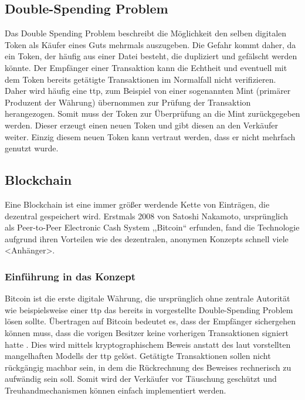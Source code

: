 \subsection{Double-Spending Problem}
\label{sec:sota_doublespend}
	Das Double Spending Problem beschreibt die Möglichkeit den selben digitalen Token als Käufer eines Guts mehrmals auszugeben\cite{Chohan2017}.
	Die Gefahr kommt daher, da ein Token, der häufig aus einer Datei besteht, die dupliziert und gefälscht werden könnte\cite{Chohan2017}.
	Der Empfänger einer Transaktion kann die Echtheit und eventuell mit dem Token bereits getätigte Transaktionen im Normalfall nicht verifizieren\cite{Nakamoto2008}.
	Daher wird häufig eine \gls{ttp}, zum Beispiel von einer sogenannten Mint (primärer Produzent der Währung) übernommen zur Prüfung der Transaktion herangezogen\cite{Nakamoto2008}.
	Somit muss der Token zur Überprüfung an die Mint zurückgegeben werden. 
	Dieser erzeugt einen neuen Token und gibt diesen an den Verkäufer weiter.
	Einzig diesem neuen Token kann vertraut werden, dass er nicht mehrfach genutzt wurde\cite{Nakamoto2008}.
	
\subsection{Blockchain}
\label{sec:sota_blockchain}
    Eine Blockchain ist eine immer größer werdende Kette von Einträgen, die dezentral gespeichert wird. 
    Erstmals 2008 von Satoshi Nakamoto, ursprünglich als Peer-to-Peer Electronic Cash System ,,Bitcoin`` erfunden, fand die Technologie aufgrund ihren Vorteilen wie des dezentralen, anonymen Konzepts schnell viele <Anhänger>. 
    
    \subsubsection{Einführung in das Konzept}
    \label{sec:sota_blockchain_introduction}
    Bitcoin ist die erste digitale Währung, die ursprünglich ohne zentrale Autorität wie beispielsweise einer \gls{ttp} das bereits in  vorgestellte Double-Spending Problem lösen sollte\cite{Nakamoto2008}. 
    Übertragen auf Bitcoin bedeutet es, dass der Empfänger sichergehen können muss, dass die vorigen Besitzer keine vorherigen Transaktionen signiert hatte \cite{Nakamoto2008}.
    Dies wird mittels kryptographischem Beweis anstatt des laut \citeauthor{Nakamoto2008} vorstellten mangelhaften Modells der \gls{ttp} gelöst.
    Getätigte Transaktionen sollen nicht rückgängig machbar sein, in dem die Rückrechnung des Beweises rechnerisch zu aufwändig sein soll\cite{Nakamoto2008}.
    Somit wird der Verkäufer vor Täuschung geschützt und Treuhandmechanismen können einfach implementiert werden\cite{Nakamoto2008}.  
    
